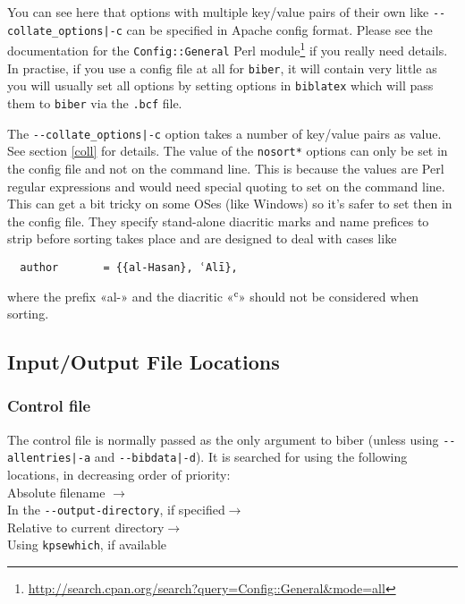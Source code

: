 \documentclass{ltxdockit}
\begin{document}
\noindent You can see here that options with multiple key/value pairs of their own
like \verb+--collate_options|-c+ can be specified in
Apache config format. Please see the documentation
for the \verb+Config::General+ Perl
module\footnote{\url{http://search.cpan.org/search?query=Config::General&mode=all}}
if you really need details. In practise, if you use a config file at all
for \verb+biber+, it will contain very little as you will usually set all
options by setting options in \verb+biblatex+ which will pass them to
\verb+biber+ via the \verb+.bcf+ file.

The \verb+--collate_options|-c+ option takes a number of key/value pairs as
value. See section \ref{coll} for details. The value of the \verb+nosort*+
options can only be set in the config file and not on the command line.
This is because the values are Perl regular expressions and would need special
quoting to set on the command line. This can get a bit tricky on some OSes
(like Windows) so it's safer to set then in the config file. They specify
stand-alone diacritic marks and name prefices to strip before sorting takes
place and are designed to deal with cases like

\begin{verbatim}
  author	   = {{al-Hasan}, ʿAlī},
\end{verbatim}

\noindent where the prefix «al-» and the diacritic «ʿ» should not be
considered when sorting.

\subsection{Input/Output File Locations}

\subsubsection{Control file}\label{loc:cf}

The control file is normally passed as the only argument to biber
(unless using \verb+--allentries|-a+ and \verb+--bibdata|-d+). It is
searched for using the following locations, in decreasing order of
priority:\\[2ex]

\noindent Absolute filename $\rightarrow$\\
\hspace*{1em}In the \verb+--output-directory+, if specified$\rightarrow$\\
\hspace*{2em}Relative to current directory$\rightarrow$\\
\hspace*{3em}Using \verb+kpsewhich+, if available
\end{document}
